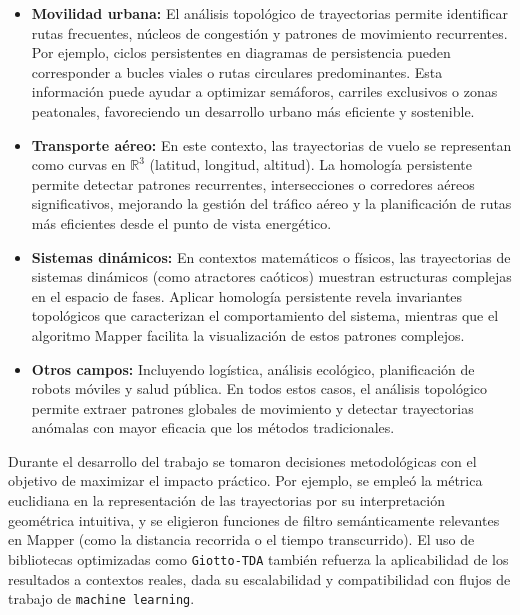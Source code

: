\begin{itemize}
    \item \textbf{Movilidad urbana:} El análisis topológico de trayectorias permite identificar rutas frecuentes, núcleos de congestión y patrones de movimiento recurrentes. Por ejemplo, ciclos persistentes en diagramas de persistencia pueden corresponder a bucles viales o rutas circulares predominantes. Esta información puede ayudar a optimizar semáforos, carriles exclusivos o zonas peatonales, favoreciendo un desarrollo urbano más eficiente y sostenible.
    
    \item \textbf{Transporte aéreo:} En este contexto, las trayectorias de vuelo se representan como curvas en \(\mathbb{R}^3\) (latitud, longitud, altitud). La homología persistente permite detectar patrones recurrentes, intersecciones o corredores aéreos significativos, mejorando la gestión del tráfico aéreo y la planificación de rutas más eficientes desde el punto de vista energético.
    
    \item \textbf{Sistemas dinámicos:} En contextos matemáticos o físicos, las trayectorias de sistemas dinámicos (como atractores caóticos) muestran estructuras complejas en el espacio de fases. Aplicar homología persistente revela invariantes topológicos que caracterizan el comportamiento del sistema, mientras que el algoritmo Mapper facilita la visualización de estos patrones complejos.
    
    \item \textbf{Otros campos:} Incluyendo logística, análisis ecológico, planificación de robots móviles y salud pública. En todos estos casos, el análisis topológico permite extraer patrones globales de movimiento y detectar trayectorias anómalas con mayor eficacia que los métodos tradicionales.
\end{itemize}

Durante el desarrollo del trabajo se tomaron decisiones metodológicas con el objetivo de maximizar el impacto práctico. Por ejemplo, se empleó la métrica euclidiana en la representación de las trayectorias por su interpretación geométrica intuitiva, y se eligieron funciones de filtro semánticamente relevantes en Mapper (como la distancia recorrida o el tiempo transcurrido). El uso de bibliotecas optimizadas como \texttt{Giotto-TDA} también refuerza la aplicabilidad de los resultados a contextos reales, dada su escalabilidad y compatibilidad con flujos de trabajo de \texttt{machine learning}.

